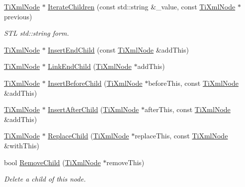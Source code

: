 \begin{DoxyCompactItemize}
\mbox{\label{class_ti_xml_node_a16e9ad53e2f5445b14bf325c90aa862c}} 
\hyperlink{class_ti_xml_node}{Ti\+Xml\+Node} $\ast$ \hyperlink{class_ti_xml_node_a16e9ad53e2f5445b14bf325c90aa862c}{Iterate\+Children} (const std\+::string \&\+\_\+value, const \hyperlink{class_ti_xml_node}{Ti\+Xml\+Node} $\ast$previous)
\begin{DoxyCompactList}\small\item\em S\+TL std\+::string form. \end{DoxyCompactList}\item 
\hyperlink{class_ti_xml_node}{Ti\+Xml\+Node} $\ast$ \hyperlink{class_ti_xml_node_af287a913ce46d8dbf7ef24fec69bbaf0}{Insert\+End\+Child} (const \hyperlink{class_ti_xml_node}{Ti\+Xml\+Node} \&add\+This)
\item 
\hyperlink{class_ti_xml_node}{Ti\+Xml\+Node} $\ast$ \hyperlink{class_ti_xml_node_a1a881212554b759865f6cac79a851d38}{Link\+End\+Child} (\hyperlink{class_ti_xml_node}{Ti\+Xml\+Node} $\ast$add\+This)
\item 
\hyperlink{class_ti_xml_node}{Ti\+Xml\+Node} $\ast$ \hyperlink{class_ti_xml_node_a71e54e393336382bc9875f64aab5cb15}{Insert\+Before\+Child} (\hyperlink{class_ti_xml_node}{Ti\+Xml\+Node} $\ast$before\+This, const \hyperlink{class_ti_xml_node}{Ti\+Xml\+Node} \&add\+This)
\item 
\hyperlink{class_ti_xml_node}{Ti\+Xml\+Node} $\ast$ \hyperlink{class_ti_xml_node_a274db3292218202805c093f66a964cb5}{Insert\+After\+Child} (\hyperlink{class_ti_xml_node}{Ti\+Xml\+Node} $\ast$after\+This, const \hyperlink{class_ti_xml_node}{Ti\+Xml\+Node} \&add\+This)
\item 
\hyperlink{class_ti_xml_node}{Ti\+Xml\+Node} $\ast$ \hyperlink{class_ti_xml_node_a543208c2c801c84a213529541e904b9f}{Replace\+Child} (\hyperlink{class_ti_xml_node}{Ti\+Xml\+Node} $\ast$replace\+This, const \hyperlink{class_ti_xml_node}{Ti\+Xml\+Node} \&with\+This)
\item 
\mbox{\label{class_ti_xml_node_ae19d8510efc90596552f4feeac9a8fbf}} 
bool \hyperlink{class_ti_xml_node_ae19d8510efc90596552f4feeac9a8fbf}{Remove\+Child} (\hyperlink{class_ti_xml_node}{Ti\+Xml\+Node} $\ast$remove\+This)
\begin{DoxyCompactList}\small\item\em Delete a child of this node. \end{DoxyCompactList}\item 
\mbox{\label{class_ti_xml_node_a8aacf06b1a577ff0d7cfa502cc76da32}} 

\end{DoxyCompactItemize}

